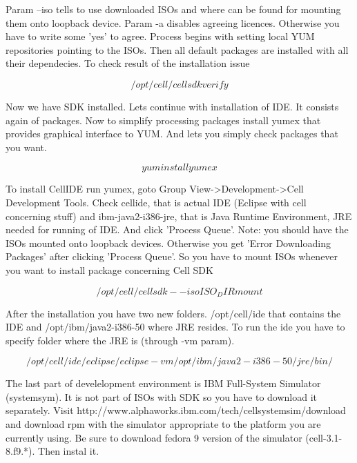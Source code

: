 \documentclass{article}
\begin{document}
Param --iso tells to use downloaded ISOs and where can be found for mounting them onto loopback device. Param -a disables agreeing licences. Otherwise you have to write some 'yes' to agree. Process begins with setting local YUM repositories pointing to the ISOs. Then all default packages are installed with all their dependecies. To check result of the installation issue

\begin{equation}
/opt/cell/cellsdk verify
\end{equation}

Now we have SDK installed. Lets continue with installation of IDE. It consists again of packages. Now to simplify processing packages install yumex that provides graphical interface to YUM. And lets you simply check packages that you want.

\begin{equation}
yum install yumex
\end{equation}

To install CellIDE run yumex, goto Group View->Development->Cell Development Tools. Check cellide, that is actual IDE (Eclipse with cell concerning stuff) and ibm-java2-i386-jre, that is Java Runtime Environment, JRE needed for running of IDE. And click 'Process Queue'. Note: you should have the ISOs mounted onto loopback devices. Otherwise you get 'Error Downloading Packages' after clicking 'Process Queue'. So you have to mount ISOs whenever you want to install package concerning Cell SDK

\begin{equation}
/opt/cell/cellsdk --iso ISO_DIR mount
\end{equation}

After the installation you have two new folders. /opt/cell/ide that contains the IDE and /opt/ibm/java2-i386-50 where JRE resides. To run the ide you have to specify folder where the JRE is (through -vm param).

\begin{equation}
/opt/cell/ide/eclipse/eclipse -vm /opt/ibm/java2-i386-50/jre/bin/
\end{equation}

The last part of develelopment environment is IBM Full-System Simulator (systemsym). It is not part of ISOs with SDK so you have to download it separately. Visit http://www.alphaworks.ibm.com/tech/cellsystemsim/download and download rpm with the simulator appropriate to the platform you are currently using. Be sure to download fedora 9 version of the simulator (cell-3.1-8.f9.*). Then instal it.
\end{document}
